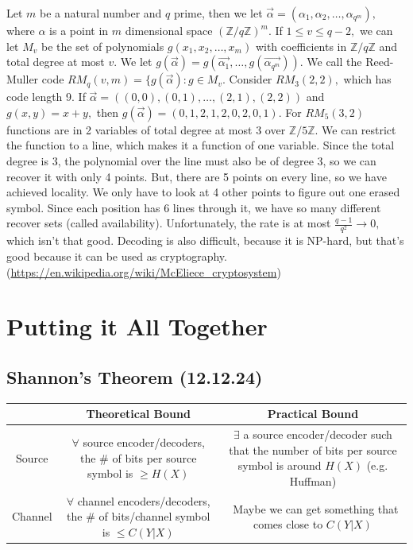 \documentclass[12pt]{article}
\newcommand{\shrug}[1][]{%
\begin{tikzpicture}[baseline,x=0.8\ht\strutbox,y=0.8\ht\strutbox,line width=0.125ex,#1]
\def\arm{(-2.5,0.95) to (-2,0.95) (-1.9,1) to (-1.5,0) (-1.35,0) to (-0.8,0)};
\draw \arm;
\draw[xscale=-1] \arm;
\def\headpart{(0.6,0) arc[start angle=-40, end angle=40,x radius=0.6,y radius=0.8]};
\draw \headpart;
\draw[xscale=-1] \headpart;
\def\eye{(-0.075,0.15) .. controls (0.02,0) .. (0.075,-0.15)};
\draw[shift={(-0.3,0.8)}] \eye;
\draw[shift={(0,0.85)}] \eye;
\draw (-0.1,0.2) to [out=15,in=-100] (0.4,0.95); 
\end{tikzpicture}}
\begin{document}
Let $m$ be a natural number and $q$ prime, then we let $\vec{\alpha}=(\alpha_{1},\alpha_2,\dots,\alpha_{q^m}),$ where $\alpha$ is a point in $m$ dimensional space $(\mathbb{Z}/q\mathbb{Z})^m.$ If $1\le v\le q-2,$ we can let $M_v$ be the set of polynomials $g(x_1,x_2,\dots,x_m)$ with coefficients in $\mathbb{Z}/q\mathbb{Z}$ and total degree at most $v.$ We let $g(\vec{\alpha})=g(\vec{\alpha_1},\dots,g(\vec{\alpha_{q^m}})).$
We call the Reed-Muller code $RM_q(v,m)=\{g(\vec{\alpha}):g\in M_v.$
Consider $RM_3(2,2),$ which has code length 9.
If $\vec{\alpha}=((0,0),(0,1),\dots,(2,1),(2,2))$ and $g(x,y)=x+y,$ then $g(\vec{\alpha})=(0,1,2,1,2,0,2,0,1).$
For $RM_5(3,2)$ functions are in 2 variables of total degree at most 3 over $\mathbb{Z}/5\mathbb{Z}.$ We can restrict the function to a line, which makes it a function of one variable. Since the total degree is 3, the polynomial over the line must also be of degree 3, so we can recover it with only 4 points. But, there are 5 points on every line, so we have achieved locality. We only have to look at 4 other points to figure out one erased symbol. Since each position has 6 lines through it, we have so many different recover sets (called availability). Unfortunately, the rate is at most $\frac{q-1}{q^2}\to 0,$ which isn't that good. Decoding is also difficult, because it is NP-hard, but that's good because it can be used as cryptography. (\url{https://en.wikipedia.org/wiki/McEliece_cryptosystem})

\section{Putting it All Together}
\subsection{Shannon's Theorem (12.12.24)}
\begin{tabular}{|  c|c|c|}\hline
&Theoretical Bound&Practical Bound\\
\hline
Source&\makecell{$\forall$ source encoder/decoders, \\ the \# of bits per source symbol is  $\ge H(X)$}&\makecell{$\exists$ a source encoder/decoder such that \\ the number of bits per source symbol \\ is around $H(X)$ (e.g. Huffman)}\\ \hline
Channel&\makecell{$\forall$ channel encoders/decoders, \\ the \# of bits/channel symbol is $\le C(Y|X)$}&\makecell{\shrug\  Maybe we can get something \\ that comes close to $C(Y|X)$}\\ \hline
\end{tabular}
\end{document}

